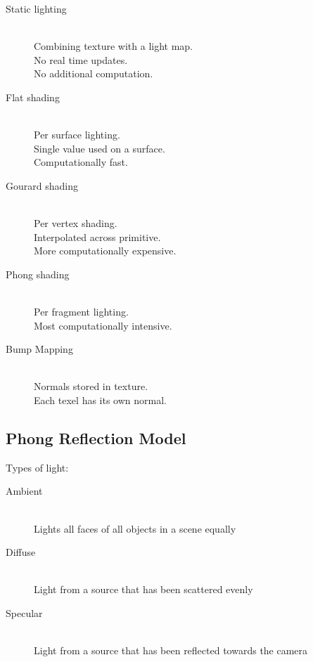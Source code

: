 \documentclass[a4paper]{article}
\begin{document}
\begin{description}
  \item[Static lighting] \hfill \\
    Combining texture with a light map. \\
    No real time updates. \\
    No additional computation.

  \item[Flat shading] \hfill \\
    Per surface lighting. \\
    Single value used on a surface. \\
    Computationally fast.

  \item[Gourard shading] \hfill \\
    Per vertex shading. \\
    Interpolated across primitive. \\
    More computationally expensive.

  \item[Phong shading] \hfill \\
    Per fragment lighting. \\
    Most computationally intensive.

  \item[Bump Mapping] \hfill \\
    Normals stored in texture. \\
    Each texel has its own normal.

\end{description}

\subsection{Phong Reflection Model}

Types of light:

\begin{description}
  \item[Ambient] \hfill \\
    Lights all faces of all objects in a scene equally

  \item[Diffuse] \hfill \\
    Light from a source that has been scattered evenly

  \item[Specular] \hfill \\
    Light from a source that has been reflected towards the camera

\end{description}
\end{document}
